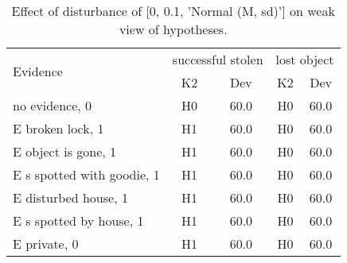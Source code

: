 \begin{table}\begin{tabular}{l|cc|cc}\toprule\multirow{2}{*}{Evidence} & \multicolumn{2}{c}{successful stolen}& \multicolumn{2}{c}{lost object}\\& {K2} & {Dev}& {K2} & {Dev}\\\midrule
no evidence, 0 & \cellcolor{Bittersweet}H0&\cellcolor{Bittersweet}60.0&\cellcolor{Bittersweet}H0&\cellcolor{Bittersweet}60.0\\E broken lock, 1 & \cellcolor{Bittersweet}H1&\cellcolor{Bittersweet}60.0&\cellcolor{Bittersweet}H0&\cellcolor{Bittersweet}60.0\\E object is gone, 1 & \cellcolor{Bittersweet}H1&\cellcolor{Bittersweet}60.0&\cellcolor{Bittersweet}H0&\cellcolor{Bittersweet}60.0\\E s spotted with goodie, 1 & \cellcolor{Bittersweet}H1&\cellcolor{Bittersweet}60.0&\cellcolor{Bittersweet}H0&\cellcolor{Bittersweet}60.0\\E disturbed house, 1 & \cellcolor{Bittersweet}H1&\cellcolor{Bittersweet}60.0&\cellcolor{Bittersweet}H0&\cellcolor{Bittersweet}60.0\\E s spotted by house, 1 & \cellcolor{Bittersweet}H1&\cellcolor{Bittersweet}60.0&\cellcolor{Bittersweet}H0&\cellcolor{Bittersweet}60.0\\E private, 0 & \cellcolor{Bittersweet}H1&\cellcolor{Bittersweet}60.0&\cellcolor{Bittersweet}H0&\cellcolor{Bittersweet}60.0\\\bottomrule\end{tabular}\caption{Effect of disturbance of [0, 0.1, 'Normal (M, sd)'] on weak view of hypotheses.}\end{table}